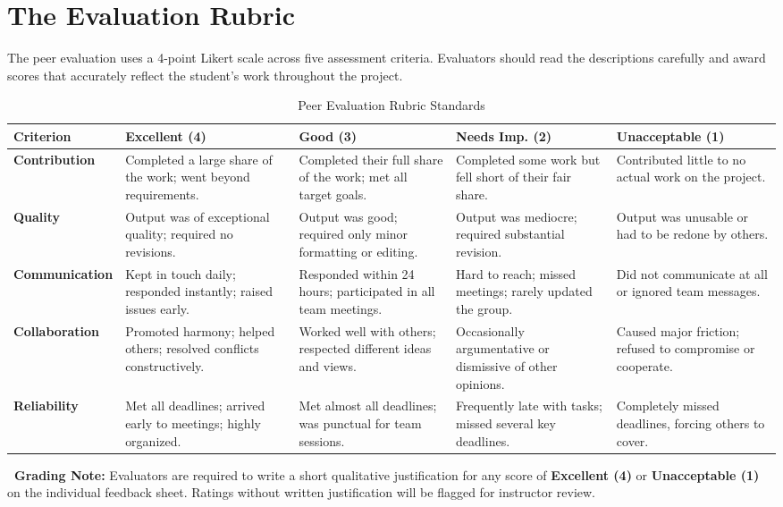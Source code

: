 \section{The Evaluation Rubric}
\label{sec:rubric}

The peer evaluation uses a 4-point Likert scale across five assessment criteria. Evaluators should read the descriptions carefully and award scores that accurately reflect the student's work throughout the project.

\begin{table}[H]
\centering
\caption{Peer Evaluation Rubric Standards}
\label{tab:rubric}
\footnotesize
\begin{tabularx}{\textwidth}{l *{4}{X}}
\toprule
\textbf{Criterion} & \textbf{Excellent (4)} & \textbf{Good (3)} & \textbf{Needs Imp. (2)} & \textbf{Unacceptable (1)} \\
\midrule
\textbf{Contribution} & Completed a large share of the work; went beyond requirements. & Completed their full share of the work; met all target goals. & Completed some work but fell short of their fair share. & Contributed little to no actual work on the project. \\
\addlinespace
\textbf{Quality} & Output was of exceptional quality; required no revisions. & Output was good; required only minor formatting or editing. & Output was mediocre; required substantial revision. & Output was unusable or had to be redone by others. \\
\addlinespace
\textbf{Communication} & Kept in touch daily; responded instantly; raised issues early. & Responded within 24 hours; participated in all team meetings. & Hard to reach; missed meetings; rarely updated the group. & Did not communicate at all or ignored team messages. \\
\addlinespace
\textbf{Collaboration} & Promoted harmony; helped others; resolved conflicts constructively. & Worked well with others; respected different ideas and views. & Occasionally argumentative or dismissive of other opinions. & Caused major friction; refused to compromise or cooperate. \\
\addlinespace
\textbf{Reliability} & Met all deadlines; arrived early to meetings; highly organized. & Met almost all deadlines; was punctual for team sessions. & Frequently late with tasks; missed several key deadlines. & Completely missed deadlines, forcing others to cover. \\
\bottomrule
\end{tabularx}
\end{table}

\noindent
\begin{tcolorbox}[
  colback=nexaamber!5,
  colframe=nexaamber!40,
  arc=3pt,
  boxrule=0.6pt,
  left=8pt,
  right=8pt,
  top=6pt,
  bottom=6pt
]
  \scriptsize\color{nexacharcoal}
  \textbf{\faExclamationTriangle\ Grading Note:} Evaluators are required to write a short qualitative justification for any score of \textbf{Excellent (4)} or \textbf{Unacceptable (1)} on the individual feedback sheet. Ratings without written justification will be flagged for instructor review.
\end{tcolorbox}
